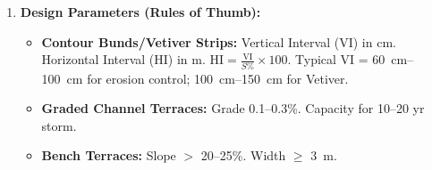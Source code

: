 \documentclass[11pt]{article}
\begin{document}
\begin{methode}
\begin{enumerate}
\begin{itemize}
      \item \textbf{Mechanical/Structural:} Contour bunds/ridges, graded bunds/channel terraces, bench terraces (steep), grass strips (Vetiver), check dams (gullies).
      \item \textbf{Biological:} Alley cropping (hedgerows), windbreaks, reforestation.
      \end{itemize}
\item \textbf{Design Parameters (Rules of Thumb):}
      \begin{itemize}
      \item \textbf{Contour Bunds/Vetiver Strips:} Vertical Interval (VI) in cm. Horizontal Interval (HI) in m. $\text{HI} = \frac{\text{VI}}{S\%} \times 100$. Typical VI = \SIrange{60}{100}{cm} for erosion control; \SIrange{100}{150}{cm} for Vetiver.
      \item \textbf{Graded Channel Terraces:} Grade 0.1--0.3\%. Capacity for 10--20 yr storm.
      \item \textbf{Bench Terraces:} Slope $>$ 20--25\%. Width $\ge$ \SI{3}{m}.
      \end{itemize}
\end{enumerate}
\end{methode}
\end{document}
